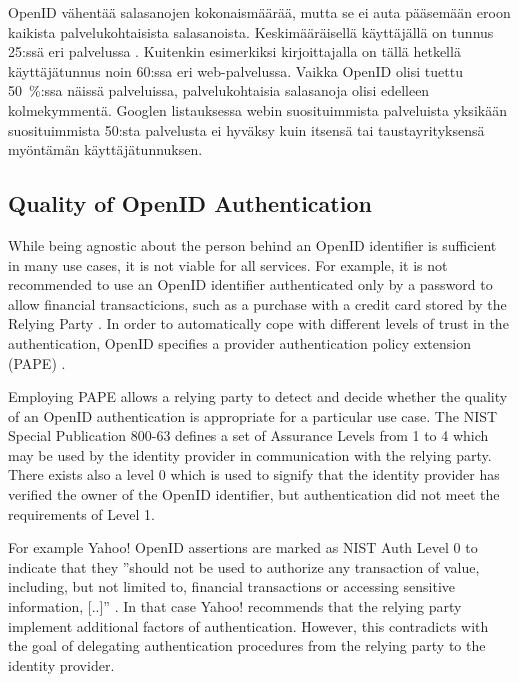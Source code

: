 \documentclass[english,gradu]{tktltiki}
\begin{document}
OpenID vähentää salasanojen kokonaismäärää, mutta se ei auta pääsemään eroon kaikista palvelukohtaisista
salasanoista. Keskimääräisellä käyttäjällä on tunnus 25:ssä eri palvelussa \cite{study_of_passwords_07}.
Kuitenkin esimerkiksi kirjoittajalla on tällä hetkellä käyttäjätunnus noin 60:ssa eri web-palvelussa. Vaikka
OpenID olisi tuettu 50~\%:ssa näissä palveluissa, palvelukohtaisia salasanoja olisi edelleen kolmekymmentä.
Googlen listauksessa webin suosituimmista palveluista \cite{google_top1000_sites} yksikään suosituimmista
50:sta palvelusta ei hyväksy kuin itsensä tai taustayrityksensä myöntämän käyttäjätunnuksen.




\subsection{Quality of OpenID Authentication} %
\label{sub:quality_of_openid_authentication}

   While being agnostic about the person behind an OpenID identifier is sufficient in many use cases, it is not viable for all services. For example, it is not recommended to use an OpenID identifier authenticated only by a password to allow financial transacticions, such as a purchase with a credit card stored by the Relying Party \cite{yahoo_openid_bestpractices_2010}. In order to automatically cope with different levels of trust in the authentication, OpenID specifies a provider authentication policy extension (PAPE) \cite{openid_2.0_specification_07, openid_2.0_pape_07}.

   Employing PAPE allows a relying party to detect and decide whether the quality of an OpenID authentication is appropriate for a particular use case. The NIST Special Publication 800-63 \cite{NIST_SP800-63} defines a set of Assurance Levels from 1 to 4 which may be used by the identity provider in communication with the relying party. There exists also a level 0 which is used to signify that the identity provider has verified the owner of the OpenID identifier, but authentication did not meet the requirements of Level 1.

   For example Yahoo! OpenID assertions are marked as NIST Auth Level 0 to indicate that they ''should not be used to authorize any transaction of value, including, but not limited to, financial transactions or accessing sensitive information, [..]'' \cite{yahoo_openid_bestpractices_2010}. In that case Yahoo! recommends that the relying party implement additional factors of authentication. However, this contradicts with the goal of delegating authentication procedures from the relying party to the identity provider.
\end{document}
